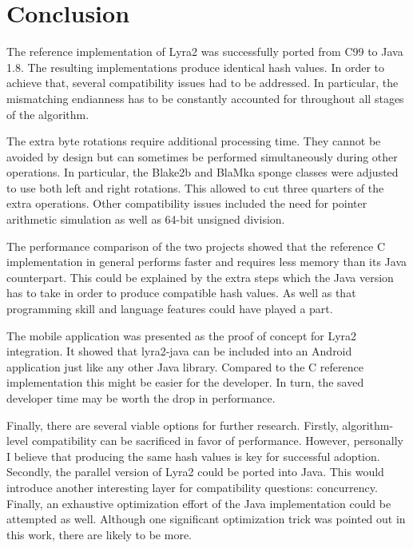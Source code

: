 \chapter{Conclusion}
\label{sec:conclusion}

The reference implementation of Lyra2 was successfully ported from C99 to Java 1.8. The resulting implementations produce identical hash values. In order to achieve that, several compatibility issues had to be addressed. In particular, the mismatching endianness has to be constantly accounted for throughout all stages of the algorithm.

The extra byte rotations require additional processing time. They cannot be avoided by design but can sometimes be performed simultaneously during other operations. In particular, the Blake2b and BlaMka sponge classes were adjusted to use both left and right rotations. This allowed to cut three quarters of the extra operations. Other compatibility issues included the need for pointer arithmetic simulation as well as 64-bit unsigned division.

The performance comparison of the two projects showed that the reference C implementation in general performs faster and requires less memory than its Java counterpart. This could be explained by the extra steps which the Java version has to take in order to produce compatible hash values. As well as that programming skill and language features could have played a part.

The mobile application was presented as the proof of concept for Lyra2 integration. It showed that lyra2-java can be included into an Android application just like any other Java library. Compared to the C reference implementation this might be easier for the developer. In turn, the saved developer time may be worth the drop in performance.

Finally, there are several viable options for further research. Firstly, algorithm-level compatibility can be sacrificed in favor of performance. However, personally I believe that producing the same hash values is key for successful adoption. Secondly, the parallel version of Lyra2 could be ported into Java. This would introduce another interesting layer for compatibility questions: concurrency. Finally, an exhaustive optimization effort of the Java implementation could be attempted as well. Although one significant optimization trick was pointed out in this work, there are likely to be more.
